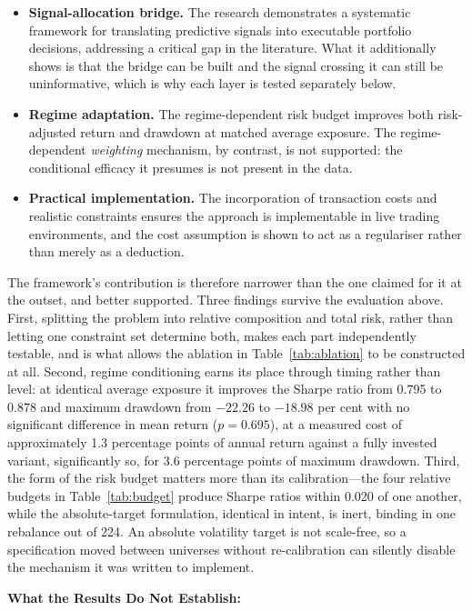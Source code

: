 \begin{itemize}
\item \textbf{Signal-allocation bridge.} The research demonstrates a systematic framework
for translating predictive signals into executable portfolio decisions, addressing a
critical gap in the literature. What it additionally shows is that the bridge can be built
and the signal crossing it can still be uninformative, which is why each layer is tested
separately below.
\item \textbf{Regime adaptation.} The regime-dependent risk budget improves both
risk-adjusted return and drawdown at matched average exposure. The regime-dependent
\emph{weighting} mechanism, by contrast, is not supported: the conditional efficacy it
presumes is not present in the data.
\item \textbf{Practical implementation.} The incorporation of transaction costs and
realistic constraints ensures the approach is implementable in live trading environments,
and the cost assumption is shown to act as a regulariser rather than merely as a
deduction.
\end{itemize}

The framework's contribution is therefore narrower than the one claimed for it at the
outset, and better supported. Three findings survive the evaluation above. First,
splitting the problem into relative composition and total risk, rather than letting one
constraint set determine both, makes each part independently testable, and is what allows
the ablation in Table~\ref{tab:ablation} to be constructed at all. Second, regime
conditioning earns its place through timing rather than level: at identical average
exposure it improves the Sharpe ratio from 0.795 to 0.878 and maximum drawdown from
$-22.26$ to $-18.98$ per cent with no significant difference in mean return
($p = 0.695$), at a measured cost of approximately 1.3 percentage points of annual return
against a fully invested variant, significantly so, for 3.6 percentage points of maximum
drawdown. Third, the form of the risk budget matters more than its calibration---the four
relative budgets in Table~\ref{tab:budget} produce Sharpe ratios within 0.020 of one
another, while the absolute-target formulation, identical in intent, is inert, binding in
one rebalance out of 224. An absolute volatility target is not scale-free, so a
specification moved between universes without re-calibration can silently disable the
mechanism it was written to implement.

\textbf{What the Results Do Not Establish:}

